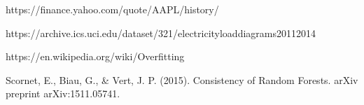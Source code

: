 
\begin{thebibliography}{99}






















	 https://finance.yahoo.com/quote/AAPL/history/

	 https://archive.ics.uci.edu/dataset/321/electricityloaddiagrams20112014

	 https://en.wikipedia.org/wiki/Overfitting

	 Scornet, E., Biau, G., \& Vert, J. P. (2015). Consistency of Random Forests. arXiv preprint arXiv:1511.05741.


\end{thebibliography}
